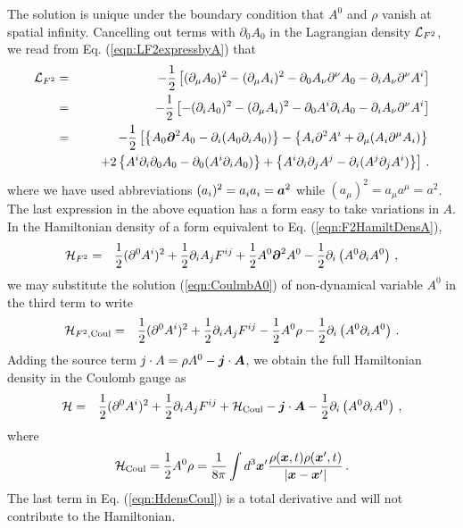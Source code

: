 The solution is unique under the boundary condition that $A^0$ and $\rho$ vanish at
spatial infinity.
Cancelling out terms with $\partial_0 A_0$ in the Lagrangian density ${\cal L}_{F^2}$,  
we read from Eq. (\ref{eqn:LF2expressbyA}) that
\begin{eqnarray}
{\cal L}_{F^2}
&=&
-\frac{1}{2}
\left[
(\partial_\mu A_0)^2
- (\partial_\mu  A_i)^2 
- \partial_0 A_\nu \partial^\nu A_0
- \partial_i A_\nu \partial^\nu A^i
\right]
\nonumber
\\
&=&
-\frac{1}{2}
\left[
-(\partial_i A_0)^2
- (\partial_\mu  A_i)^2 
- \partial_0 A^i \partial_i A_0
- \partial_i A_\nu \partial^\nu A^i
\right]
\nonumber
\\
&=&
-\frac{1}{2}
\left[
\left\{A_0 \mbox{\boldmath $\partial$}^2 A_0  - \partial_i (A_0 \partial_i A_0)\right\}
-\left\{ A_i \partial^2 A^i + \partial_\mu(A_i \partial^\mu A_i)\right\}
\right.
\nonumber\\
&&
\hspace{5mm}
\left.
+2\left\{
A^i \partial_i \partial_0 A_0 - \partial_0(A^i \partial_i A_0)
\right\}
+ \left\{
A^i \partial_i \partial_j A^j - \partial_i (A^j \partial_j A^i)
\right\}
\right]\,.
\nonumber
\label{eqn:CoulmbLinA}
\end{eqnarray}
where we have used abbreviations  $(a_i)^2 = a_i a_i = \mbox{\boldmath $a$}^2$ while
$(a_\mu)^2 = a_\mu a^\mu = a^2$.
The last expression in the above equation has a form easy to take 
variations in $A$. 
In the Hamiltonian density of a form equivalent to Eq. (\ref{eqn:F2HamiltDensA}),
\begin{eqnarray*}
{\cal H}_{F^2} 
&=&
\frac{1}{2}
(\partial^0 A^i)^2
+
\frac{1}{2}
\partial_i A_j F^{ij}
+
\frac{1}{2}
A^0 \mbox{\boldmath $\partial$}^2 A^0
-
\frac{1}{2}
\partial_i \left( A^0 \partial_i A^0 \right)\,,
\end{eqnarray*}
we may substitute the solution (\ref{eqn:CoulmbA0}) of 
non-dynamical variable $A^0$ in the third term to write
\begin{eqnarray}
{\cal H}_{F^2,\mbox{\scriptsize Coul}} 
&=&
\frac{1}{2}
(\partial^0 A^i)^2
+
\frac{1}{2}
\partial_i A_j F^{ij}
-
\frac{1}{2}
A^0 \rho
-
\frac{1}{2}
\partial_i \left( A^0 \partial_i A^0 \right) \,.
\nonumber
\end{eqnarray}
Adding the source term $j \cdot A = \rho A^0 - \mbox{\boldmath $j$} \cdot \mbox{\boldmath $A$}$, we obtain the
full Hamiltonian density in the Coulomb gauge as
\begin{eqnarray}
{\cal H} 
&=&
\frac{1}{2}
(\partial^0 A^i)^2
+
\frac{1}{2}
\partial_i A_j F^{ij}
+
{\cal H}_{\mbox{\scriptsize Coul}}
- \mbox{\boldmath $j$} \cdot \mbox{\boldmath $A$}
-
\frac{1}{2}
\partial_i \left( A^0 \partial_i A^0 \right)\,,
\label{eqn:HdensCoul}
\end{eqnarray}
where 
\begin{eqnarray}
{\cal H}_{\mbox{\scriptsize Coul}}
=
\frac{1}{2} A^0 \rho
=
\frac{1}{8\pi} \int
d^3 \mbox{\boldmath $x$}' 
\frac{\rho(\mbox{\boldmath $x$}, t) \rho(\mbox{\boldmath $x$}', t)}{|\mbox{\boldmath $x$} - \mbox{\boldmath $x$}'|}\,.
\end{eqnarray}
The last term in Eq. (\ref{eqn:HdensCoul}) is a total derivative
and will not contribute to the Hamiltonian.


